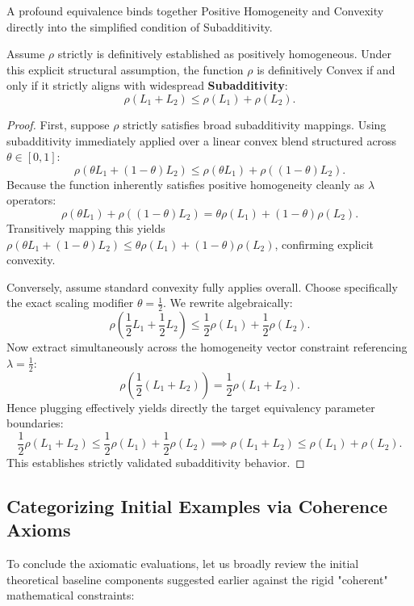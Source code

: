 A profound equivalence binds together Positive Homogeneity and Convexity directly into the simplified condition of Subadditivity.

\begin{proposition}
Assume $\rho$ strictly is definitively established as positively homogeneous. Under this explicit structural assumption, the function $\rho$ is definitively Convex if and only if it strictly aligns with widespread \textbf{Subadditivity}:
$$
\rho(L_1 + L_2) \leq \rho(L_1) + \rho(L_2).
$$
\end{proposition}

\begin{proof}
First, suppose $\rho$ strictly satisfies broad subadditivity mappings. Using subadditivity immediately applied over a linear convex blend structured across $\theta \in [0, 1]$:
$$
\rho(\theta L_1 + (1 - \theta)L_2) \leq \rho(\theta L_1) + \rho((1 - \theta)L_2).
$$
Because the function inherently satisfies positive homogeneity cleanly as $\lambda$ operators:
$$
\rho(\theta L_1) + \rho((1 - \theta)L_2) = \theta \rho(L_1) + (1 - \theta)\rho(L_2).
$$
Transitively mapping this yields $\rho(\theta L_1 + (1 - \theta) L_2) \leq \theta \rho(L_1) + (1 - \theta) \rho(L_2)$, confirming explicit convexity.

Conversely, assume standard convexity fully applies overall. Choose specifically the exact scaling modifier $\theta = \frac{1}{2}$. We rewrite algebraically:
$$
\rho\left(\frac{1}{2} L_1 + \frac{1}{2} L_2\right) \leq \frac{1}{2}\rho(L_1) + \frac{1}{2}\rho(L_2).
$$
Now extract simultaneously across the homogeneity vector constraint referencing $\lambda = \frac{1}{2}$:
$$
\rho\left(\frac{1}{2}(L_1 + L_2)\right) = \frac{1}{2}\rho(L_1 + L_2).
$$
Hence plugging effectively yields directly the target equivalency parameter boundaries:
$$
\frac{1}{2}\rho(L_1 + L_2) \leq \frac{1}{2}\rho(L_1) + \frac{1}{2}\rho(L_2) \implies \rho(L_1 + L_2) \leq \rho(L_1) + \rho(L_2).
$$
This establishes strictly validated subadditivity behavior.
\end{proof}

\subsection{Categorizing Initial Examples via Coherence Axioms}

To conclude the axiomatic evaluations, let us broadly review the initial theoretical baseline components suggested earlier against the rigid "coherent" mathematical constraints:

